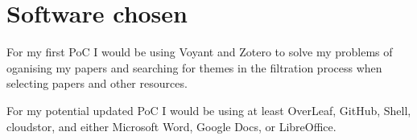\documentclass{article}
\begin{document}
\section{Software chosen}

For my first PoC I would be using Voyant and Zotero to solve my problems of oganising my papers and searching for themes in the filtration process when selecting papers and other resources.

For my potential updated PoC I would be using at least OverLeaf, GitHub, Shell, cloudstor, and either Microsoft Word, Google Docs, or LibreOffice.
\end{document}
